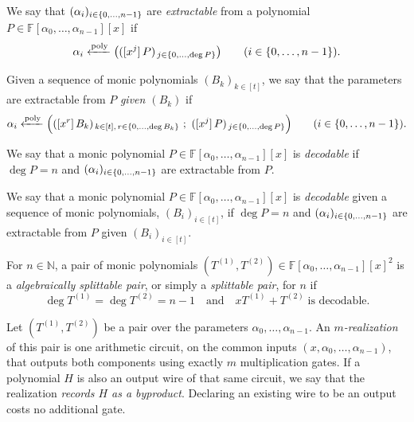 \begin{definition}[Extractable]
    We say that $(\alpha_i)_{i \in \rng{n}}$ are \emph{extractable} from a
    polynomial $P \in \mathbb{F}[\alpha_0,\ldots,\alpha_{n-1}][x]$ if
    \[
        \alpha_i\polyfrom
        \bigl((\coeff{P}{j})_{\,j\in\idx{\deg P}}\bigr)
        \qquad(i\in\rng n).
    \]

    Given a sequence of monic polynomials $(B_k)_{k\in[t]}$, we say that the
    parameters are extractable from $P$ \emph{given $(B_k)$} if
    \[
        \alpha_i\polyfrom
        \Bigl((\coeff{B_k}{r})_{\,k\in[t],\,r\in\idx{\deg B_k}}\ ;\
              (\coeff{P}{j})_{\,j\in\idx{\deg P}}\Bigr)
        \qquad(i\in\rng n).
    \]
\end{definition}

\begin{definition}[Decodable]
    We say that a monic polynomial $P \in \mathbb{F}[\alpha_0, \ldots, \alpha_{n - 1}][x]$ is \emph{decodable} if $\deg P = n$ and $(\alpha_i)_{i \in \rng{n}}$ are extractable from $P$.

    We say that a monic polynomial $P \in \mathbb{F}[\alpha_0, \ldots, \alpha_{n - 1}][x]$ is \emph{decodable} given a sequence of monic polynomials, $(B_i)_{i \in [t]}$, if $\deg P = n$ and $(\alpha_i)_{i \in \rng{n}}$ are extractable from $P$ given $(B_i)_{i \in [t]}$.
\end{definition}

\begin{definition}
    For $n\in\mathbb{N}$, a pair of monic polynomials
    $(T^{(1)},T^{(2)})\in
    \mathbb{F}[\alpha_0,\ldots,\alpha_{n-1}][x]^2$ is a
    \emph{algebraically splittable pair}, or simply a \emph{splittable pair},
    for $n$ if
    \[
        \deg T^{(1)}=\deg T^{(2)}=n-1
        \quad\text{and}\quad
        xT^{(1)}+T^{(2)}\;\text{is decodable}.
    \]
\end{definition}

\begin{definition}
\label{def:joint-realization}
Let $(T^{(1)},T^{(2)})$ be a pair over the parameters
$\alpha_0,\ldots,\alpha_{n-1}$.  An \emph{$m$-realization} of this pair is
one arithmetic circuit, on the common inputs
$(x,\alpha_0,\ldots,\alpha_{n-1})$, that outputs both components using
exactly $m$ multiplication gates.  If a polynomial $H$ is also an output
wire of that same circuit, we say that the realization \emph{records $H$ as
a byproduct}.  Declaring an existing wire to be an output costs no
additional gate.
\end{definition}

